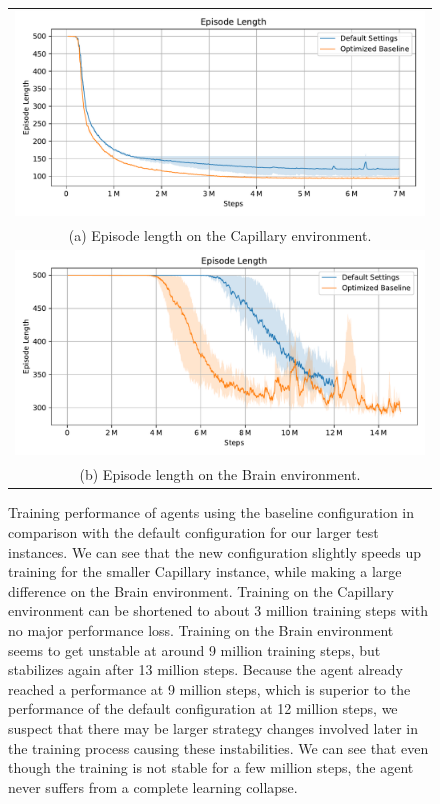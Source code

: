 \begin{figure}[htp]
    \begin{center}
        \begin{tabular}{c}
            \includegraphics[clip, width=0.93\columnwidth]{figures/evaluation/baseline/maze0518_ep_len.pdf} \\
            {\small (a) Episode length on the Capillary environment.} \\
            \addlinespace[0.5cm]
            \includegraphics[clip, width=0.93\columnwidth]{figures/evaluation/baseline/maze0122_ep_len.pdf} \\
            {\small (b) Episode length on the Brain environment.} \\
        \end{tabular}

    \end{center}
    \caption[Training Performance of Baseline Agents on Large Instances]{Training performance of agents using the baseline configuration in comparison with the default configuration for our larger test instances. We can see that the new configuration slightly speeds up training for the smaller Capillary instance, while making a large difference on the Brain environment. Training on the Capillary environment can be shortened to about 3 million training steps with no major performance loss. Training on the Brain environment seems to get unstable at around 9 million training steps, but stabilizes again after 13 million steps. Because the agent already reached a performance at 9 million steps, which is superior to the performance of the default configuration at 12 million steps, we suspect that there may be larger strategy changes involved later in the training process causing these instabilities. We can see that even though the training is not stable for a few million steps, the agent never suffers from a complete learning collapse.} \label{fig:Eval/Baselines/LargeInstances}
\end{figure}

